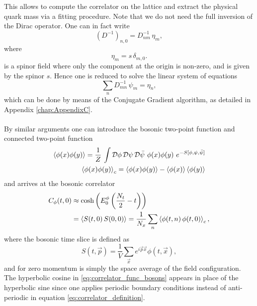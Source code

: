 This allows to compute the correlator on the lattice and extract the physical quark mass via a fitting procedure. Note that we do not need the full inversion of the Dirac operator. One can in fact write 
\begin{equation*}
    (D^{-1})_{n,0} = D^{-1}_{nm} \, \eta_{m},
\end{equation*}
where 
\begin{equation*} 
    \eta_{m} = s \, \delta_{m,0}.
\end{equation*}
is a spinor field where only the component at the origin is non-zero, and is given by the spinor $s$. Hence one is reduced to solve the linear system of equations
\begin{equation*}
    \sum_n D^{-1}_{mn} \, \psi_m = \eta_n,
\end{equation*}
which can be done by means of the Conjugate Gradient algorithm, as detailed in Appendix \ref{chap:AppendixC}.\\~\\
By similar arguments one can introduce the bosonic two-point function and connected two-point function 
\begin{equation*}
    \begin{aligned}
        \left\langle \phi(x)\phi(y) \right\rangle = \frac{1}{Z} \, \int \mathcal{D}\phi \, \mathcal{D}\psi \, \mathcal{D}\bar\psi \ \phi(x) \phi(y) \ e^{-S[\phi, \psi, \bar\psi]} \\
        \left\langle \phi(x)\phi(y) \right\rangle_c = \left\langle \phi(x)\phi(y) \right\rangle - \left\langle \phi(x) \right\rangle\left\langle \phi(y) \right\rangle
    \end{aligned}
\end{equation*}
and arrives at the bosonic correlator 
\begin{equation}
    \begin{aligned}
        C_\phi(t,0) &\approx \cosh \left(E_0^{\phi} \left(\frac{N_t}{2} - t\right)\right) \\
        &= \left\langle S(t,0) \, S(0,0) \right\rangle = \frac{1}{N_x} \sum_n \left\langle \phi(t,n) \, \phi(t,0) \right\rangle_c,
    \end{aligned}
    \label{eq:correlator_func_bosons}
\end{equation}
where the bosonic time slice is defined as 
\begin{equation*}
    S(t, \vec{p})=\frac{1}{V} \sum_{\vec{x}} e^{i \vec{p} \vec{x}} \phi(t, \vec{x}),
\end{equation*}
and for zero momentum is simply the space average of the field configuration. \\
The hyperbolic cosine in \eqref{eq:correlator_func_bosons} appears in place of the hyperbolic sine since one applies periodic boundary conditions instead of anti-periodic in equation \eqref{eq:correlator_definition}. \\
